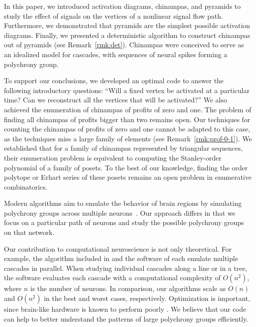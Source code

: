 \documentclass[a4paper]{article}\usepackage[english]{babel}
\theoremstyle{definition}
\begin{document}
In this paper, we introduced activation diagrams, chinampas, and pyramids to study the effect of signals on the vertices of a nonlinear signal flow path. Furthermore, we demonstrated that pyramids are the simplest possible activation diagrams. Finally, we presented a deterministic algorithm to construct chinampas out of pyramids (see Remark~\ref{rmk:det}). 
Chinampas were conceived to serve as an idealized model for cascades, with sequences of neural spikes forming a polychrony group.

To support our conclusions, we developed an optimal code to answer the following introductory questions: ``Will a fixed vertex be activated at a particular time? Can we reconstruct all the vertices that will be activated?'' We also achieved the enumeration of chinampas of profits of zero and one. The problem of finding all chinampas of profits bigger than two remains open.  Our techniques for counting the chinampas of profits of zero and one cannot be adapted to this case, as the techniques miss a large family of elements (see Remark~\ref{rmk:prof-0-1}). We established that for a family of chinampas represented by triangular sequences, their enumeration problem is equivalent to computing the Stanley-order polynomial of a family of posets. To the best of our knowledge, finding the order polytope or Erhart series of these posets remains an open problem in enumerative combinatorics. 

Modern algorithms aim to emulate the behavior of brain regions by simulating polychrony groups across multiple neurons~\cite{rep, reply}. Our approach differs in that we focus on a particular path of neurons and study the possible polychrony groups on that network.
 
 Our contribution to computational neuroscience is not only theoretical. For example, the algorithm included in \cite{izhikevich2006polychronization} and the software of \cite{ sixnetworks,leaky,neursynaptic,scalabel,neurogrid} each emulate multiple cascades in parallel. When studying individual cascades along a line or in a tree, the software evaluates each cascade with a computational complexity of $O(n^2)$, where $n$ is the number of neurons.  In comparison, our algorithms scale as $O(n)$ and $O(n^2)$ in the best and worst cases, respectively. Optimization is important, since brain-like hardware is known to perform poorly \cite{slow, cc}. We believe that our code can help to better understand the patterns of large polychrony groups efficiently.
\end{document}
